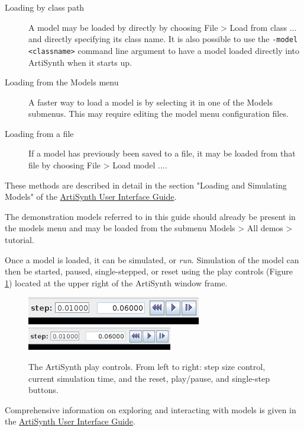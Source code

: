 \begin{description}

\item[Loading by class path]\mbox{}

A model may be loaded by directly by choosing {\sf File > Load from
class ...} and directly specifying its class name. It is also possible
to use the {\tt -model <classname>} command line argument to have a
model loaded directly into ArtiSynth when it starts up.

\item[Loading from the Models menu]\mbox{}

A faster way to load a model is by selecting it in one of the {\sf
Models} submenus. This may require editing the model menu
configuration files.

\item[Loading from a file]\mbox{}

If a model has previously been saved to a file, it may be loaded from
that file by choosing {\sf File > Load model ...}.

\end{description}

These methods are described in detail in the 
section "Loading and Simulating Models" of the
\href{../uiguide/uiguide.html}{
ArtiSynth User Interface Guide}.

\begin{sideblock}
The demonstration models referred to in this guide should already
be present in the models menu and may be loaded
from the submenu {\sf Models > All demos > tutorial}.
\end{sideblock}

Once a model is loaded, it can be simulated, or {\it run}.
Simulation
of the model can then be started, paused, single-stepped, or reset
using the play controls (Figure \ref{PlayControlsFig})
located at the upper right of the ArtiSynth window frame.

\begin{figure}[ht]
\begin{center}
\iflatexml
\includegraphics[]{../installation/images/playControls}
\else
\includegraphics[width=2.5in]{../installation/images/playControls}
\fi
\end{center}
\caption{The ArtiSynth play controls. From left to right: step size
control, current simulation time, and the reset, play/pause, and
single-step buttons.}%
\label{PlayControlsFig}
\end{figure}

Comprehensive information on exploring and interacting with models is
given in the
\href{../uiguide/uiguide.html}
{ArtiSynth User Interface Guide}.

